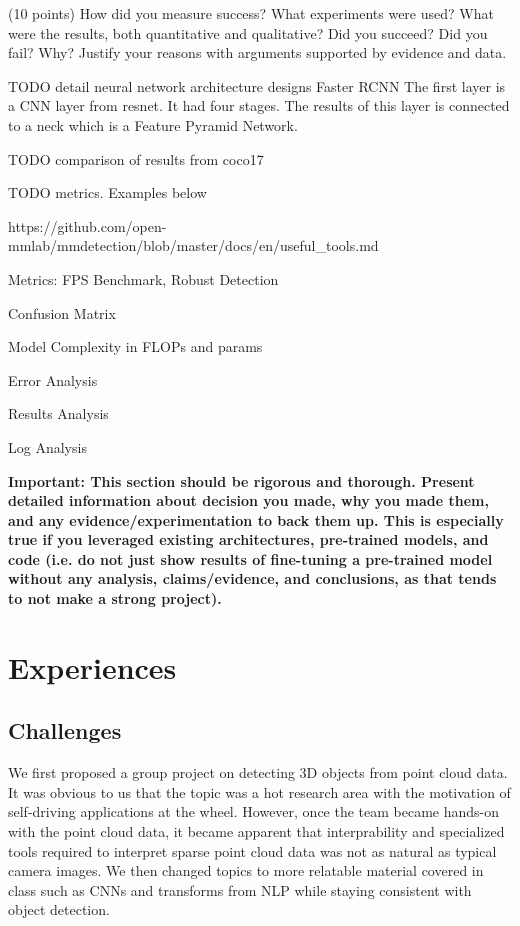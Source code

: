 \documentclass[10pt,twocolumn,letterpaper]{article}
\begin{document}
(10 points) How did you measure success? What experiments were used? What were the results, both quantitative and qualitative? Did you succeed? Did you fail? Why? Justify your reasons with arguments supported by evidence and data.

TODO detail neural network architecture designs
Faster RCNN
The first layer is a CNN layer from resnet. It had four stages. The results of this layer is connected to a neck which is a Feature Pyramid Network. 


TODO comparison of results from coco17

TODO metrics. Examples below

https://github.com/open-mmlab/mmdetection/blob/master/docs/en/useful_tools.md

Metrics: FPS Benchmark, Robust Detection

Confusion Matrix

Model Complexity in FLOPs and params

Error Analysis

Results Analysis

Log Analysis


\textbf{Important: This section should be rigorous and thorough. Present detailed information about decision you made, why you made them, and any evidence/experimentation to back them up. This is especially true if you leveraged existing architectures, pre-trained models, and code (i.e. do not just show results of fine-tuning a pre-trained model without any analysis, claims/evidence, and conclusions, as that tends to not make a strong project). }

\section{Experiences}


\subsection{Challenges}

We first proposed a group project on detecting 3D objects from point cloud data. It was obvious to us that the topic was a hot research area with the motivation of self-driving applications at the wheel. However, once the team became hands-on with the point cloud data, it became apparent that interprability and specialized tools required to interpret sparse point cloud data was not as natural as typical camera images. We then changed topics to more relatable material covered in class such as CNNs and transforms from NLP while staying consistent with object detection.
\end{document}
